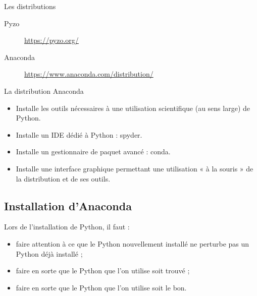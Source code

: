 \documentclass[10pt,aspectratio=169]{beamer}
\begin{document}
\begin{frame}{Les distributions}
  \begin{description}
  \item[Pyzo] \url{https://pyzo.org/}
  \item[Anaconda] \alert{\faHandPointRight[regular]}\url{https://www.anaconda.com/distribution/}\alert{\faHandPointLeft[regular]}
  \end{description}
\end{frame}

\begin{frame}{La distribution Anaconda}
  \begin{itemize}
  \item Installe les outils nécessaires à une \alert{utilisation scientifique} (au sens large) de Python.
  \item Installe un IDE dédié à Python : \alert{spyder}.
  \item Installe un gestionnaire de paquet avancé : \alert{conda}.
  \item Installe une \alert{interface graphique} permettant une utilisation « à la souris » de la distribution et de ses outils.
  \end{itemize}
\end{frame}

\subsection{Installation d'Anaconda}

\begin{frame}
  \begin{Attention}
    Lors de l'installation de Python, il faut :
    \begin{itemize}
    \item faire attention à ce que le Python nouvellement installé \alert{ne perturbe pas} un Python déjà installé ;
    \item faire en sorte que le Python que l'on utilise soit \alert{trouvé} ;
    \item faire en sorte que le Python que l'on utilise soit \alert{le bon}.
    \end{itemize}
  \end{Attention}
\end{frame}
\end{document}
